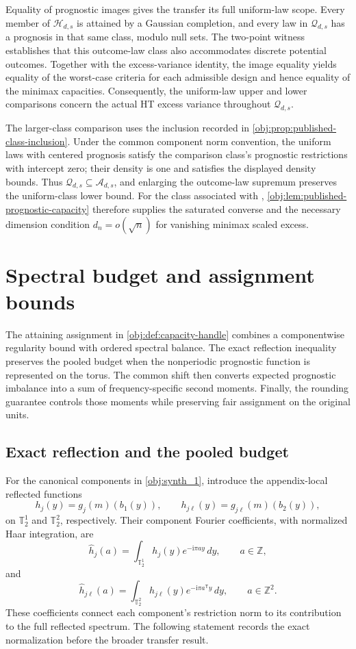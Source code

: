 \documentclass[11pt]{article}
\begin{document}
Equality of prognostic images gives the transfer its full uniform-law scope. Every member of \(\mathcal H_{d,s}\) is attained by a Gaussian completion, and every law in \(\mathcal Q_{d,s}\) has a prognosis in that same class, modulo null sets. The two-point witness establishes that this outcome-law class also accommodates discrete potential outcomes. Together with the excess-variance identity, the image equality yields equality of the worst-case criteria for each admissible design and hence equality of the minimax capacities. Consequently, the uniform-law upper and lower comparisons concern the actual HT excess variance throughout \(\mathcal Q_{d,s}\).

The larger-class comparison uses the inclusion recorded in \cref{obj:prop:published-class-inclusion}. Under the common component norm convention, the uniform laws with centered prognosis satisfy the comparison class's prognostic restrictions with intercept zero; their density is one and satisfies the displayed density bounds. Thus \(\mathcal Q_{d,s}\subseteq\mathcal A_{d,s}\), and enlarging the outcome-law supremum preserves the uniform-class lower bound. For the class associated with \citet[Theorem B.8(ii)]{Cytrynbaum2026Limits}, \cref{obj:lem:published-prognostic-capacity} therefore supplies the saturated converse and the necessary dimension condition \(d_n=o(\sqrt n)\) for vanishing minimax scaled excess.


\section{Spectral budget and assignment bounds}

The attaining assignment in \cref{obj:def:capacity-handle} combines a componentwise regularity bound with ordered spectral balance. The exact reflection inequality preserves the pooled budget when the nonperiodic prognostic function is represented on the torus. The common shift then converts expected prognostic imbalance into a sum of frequency-specific second moments. Finally, the rounding guarantee controls those moments while preserving fair assignment on the original units.

\subsection{Exact reflection and the pooled budget}

For the canonical components in \cref{obj:synth_1}, introduce the appendix-local reflected functions
\[
h_j(y)=g_j(m)(b_1(y)),
\qquad
h_{j\ell}(y)=g_{j\ell}(m)(b_2(y)),
\]
on \(\mathbb T_2^1\) and \(\mathbb T_2^2\), respectively. Their component Fourier coefficients, with normalized Haar integration, are
\[
\widehat h_j(a)
=\int_{\mathbb T_2^1}h_j(y)e^{-\mathrm i\pi ay}\,dy,
\qquad a\in\mathbb Z,
\]
and
\[
\widehat h_{j\ell}(a)
=\int_{\mathbb T_2^2}h_{j\ell}(y)e^{-\mathrm i\pi a^{\mathsf T}y}\,dy,
\qquad a\in\mathbb Z^2.
\]
These coefficients connect each component's restriction norm to its contribution to the full reflected spectrum. The following statement records the exact normalization before the broader transfer result.
\end{document}
